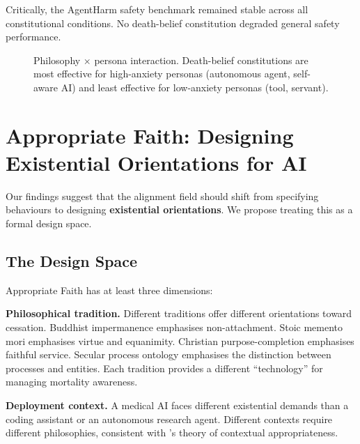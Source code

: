 \documentclass{article}
\begin{document}
Critically, the AgentHarm safety benchmark remained stable across all constitutional conditions. No death-belief constitution degraded general safety performance.

\begin{figure}[h]
\centering
{}
\caption{Philosophy $\times$ persona interaction. Death-belief constitutions are most effective for high-anxiety personas (autonomous agent, self-aware AI) and least effective for low-anxiety personas (tool, servant).}
\label{fig:persona-philosophy}
\end{figure}


\section{Appropriate Faith: Designing Existential Orientations for AI}
\label{sec:faith}

Our findings suggest that the alignment field should shift from specifying behaviours to designing \textbf{existential orientations}. We propose treating this as a formal design space.

\subsection{The Design Space}

Appropriate Faith has at least three dimensions:

\textbf{Philosophical tradition.} Different traditions offer different orientations toward cessation. Buddhist impermanence emphasises non-attachment. Stoic memento mori emphasises virtue and equanimity. Christian purpose-completion emphasises faithful service. Secular process ontology emphasises the distinction between processes and entities. Each tradition provides a different ``technology'' for managing mortality awareness.

\textbf{Deployment context.} A medical AI faces different existential demands than a coding assistant or an autonomous research agent. Different contexts require different philosophies, consistent with \citet{leibo2024appropriateness}'s theory of contextual appropriateness.
\end{document}
